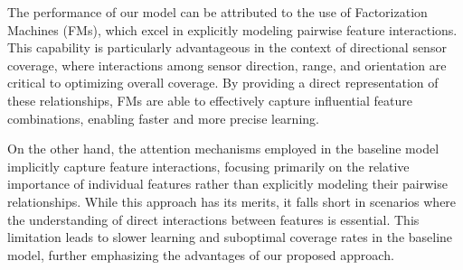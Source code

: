 \documentclass[preprint,12pt]{elsarticle}
\begin{document}
The performance of our model can be attributed to the use of Factorization Machines (FMs), which excel in explicitly modeling pairwise feature interactions. This capability is particularly advantageous in the context of directional sensor coverage, where interactions among sensor direction, range, and orientation are critical to optimizing overall coverage. By providing a direct representation of these relationships, FMs are able to effectively capture influential feature combinations, enabling faster and more precise learning.

On the other hand, the attention mechanisms employed in the baseline model implicitly capture feature interactions, focusing primarily on the relative importance of individual features rather than explicitly modeling their pairwise relationships. While this approach has its merits, it falls short in scenarios where the understanding of direct interactions between features is essential. This limitation leads to slower learning and suboptimal coverage rates in the baseline model, further emphasizing the advantages of our proposed approach.


\end{document}
